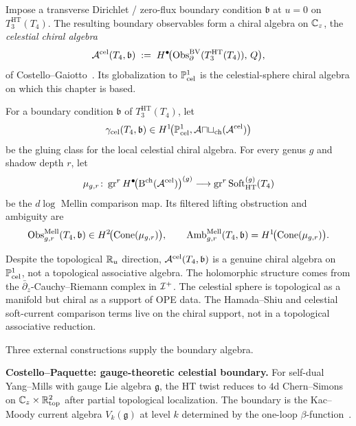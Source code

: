 \begin{definition}
\label{def:uch-boundary-chiral-algebra}
Impose a transverse Dirichlet / zero-flux boundary condition
$\mathfrak b$ at
$u = 0$ on $T_3^{\mathrm{HT}}(T_4)$. The resulting boundary observables
form a chiral algebra on $\mathbb C_z$, the \emph{celestial chiral algebra}
\[
\mathcal A^{\mathrm{cel}}(T_4,\mathfrak b)
\;:=\;
H^\bullet\!\bigl(\operatorname{Obs}_\partial^{\text{BV}}(T_3^{\mathrm{HT}}(T_4)),\,Q\bigr),
\]
of Costello--Gaiotto~\cite{CostelloGaiottoBoundaryVOA}. Its
globalization to $\mathbb P^1_{\text{cel}}$ is the celestial-sphere
chiral algebra on which this chapter is based.
\end{definition}

\begin{definition}
\label{def:uch-comparison-classes}
For a boundary condition $\mathfrak b$ of $T_3^{\mathrm{HT}}(T_4)$,
let
\[
\gamma_{\mathrm{cel}}(T_4,\mathfrak b)
\in
H^1\!\bigl(\mathbb P^1_{\mathrm{cel}},
\mathcal{Aut}_{\mathrm{ch}}(\mathcal A^{\mathrm{cel}})\bigr)
\]
be the gluing class for the local celestial chiral algebra. For every
genus $g$ and shadow depth $r$, let
\[
\mu_{g,r}\colon
\operatorname{gr}^r H^\bullet\!\bigl(\mathrm B^{\mathrm{ch}}(\mathcal A^{\mathrm{cel}})\bigr)^{(g)}
\longrightarrow
\operatorname{gr}^r\mathrm{Soft}^{(g)}_{\mathrm{HT}}(T_4)
\]
be the $d\log$ Mellin comparison map. Its filtered lifting obstruction
and ambiguity are
\[
\operatorname{Obs}^{\mathrm{Mell}}_{g,r}(T_4,\mathfrak b)
\in H^2\!\bigl(\operatorname{Cone}(\mu_{g,r})\bigr),
\qquad
\mathrm{Amb}^{\mathrm{Mell}}_{g,r}(T_4,\mathfrak b)
= H^1\!\bigl(\operatorname{Cone}(\mu_{g,r})\bigr).
\]
\end{definition}

\begin{remark}
\label{rem:uch-chiral-not-topological}
Despite the topological $\mathbb R_u$ direction,
$\mathcal A^{\mathrm{cel}}(T_4,\mathfrak b)$ is a genuine chiral algebra on
$\mathbb P^1_{\text{cel}}$, not a topological associative algebra. The
holomorphic structure comes from the
$\bar\partial_z$-Cauchy--Riemann complex in $\mathcal I^+$. The celestial
sphere is topological as a manifold but chiral as a support of OPE
data. The Hamada--Shiu and celestial soft-current comparison terms
live on the chiral support, not in a topological associative reduction.
\end{remark}

Three external constructions supply the boundary algebra.

\medskip
\noindent\textbf{Costello--Paquette: gauge-theoretic celestial
boundary.} For self-dual Yang--Mills with gauge Lie algebra
$\mathfrak g$, the HT twist reduces to $4$d Chern--Simons on
$\mathbb C_z \times \mathbb R^2_{\text{top}}$ after partial topological
localization. The boundary is the Kac--Moody current algebra
$V_k(\mathfrak g)$ at level $k$ determined by the one-loop
$\beta$-function~\cite{CostelloPaquetteTwistedSugraStates}.

